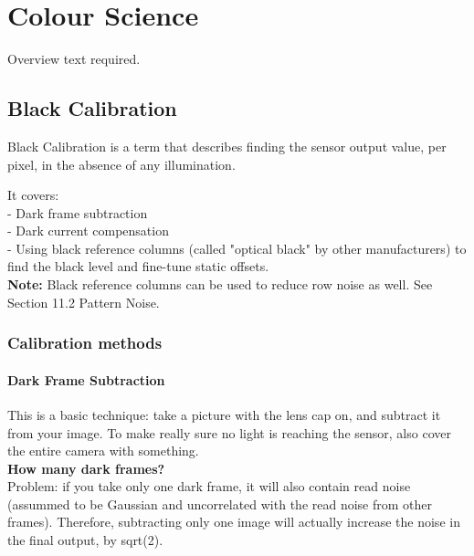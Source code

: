 \section{Colour Science}

Overview text required.





\subsection{Black Calibration}

Black Calibration is a term that describes finding the sensor output value, per pixel, in the absence of any illumination.

It covers:\\

- Dark frame subtraction\\
- Dark current compensation\\
- Using black reference columns (called "optical black" by other manufacturers) to find the black level and fine-tune static offsets. \\

\textbf{Note:} Black reference columns can be used to reduce row noise as well. See Section 11.2 Pattern Noise.





\subsubsection{Calibration methods}





\paragraph{Dark Frame Subtraction}

This is a basic technique: take a picture with the lens cap on, and subtract it from your image. To make really sure no light is reaching the sensor, also cover the entire camera with something.\\ 

\textbf{How many dark frames?}\\

Problem: if you take only one dark frame, it will also contain read noise (assummed to be Gaussian and uncorrelated with the read noise from other frames). Therefore, subtracting only one image will actually increase the noise in the final output, by sqrt(2).\\

